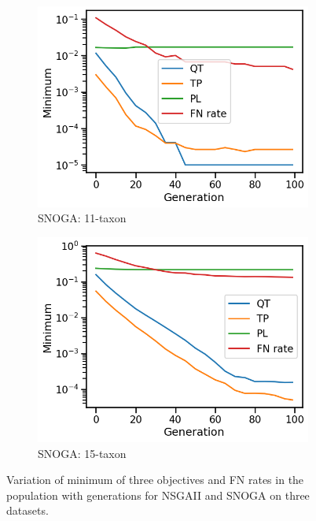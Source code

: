 \begin{figure}[!htbp]
\begin{adjustwidth}{-1cm}{-1cm}
\begin{subfigure}[b]{0.4\textwidth}
			\includegraphics[width=\textwidth]{Figure/11-taxon_NOSSGA_minimum}
			\caption{SNOGA: 11-taxon}
		\end{subfigure}%
		\begin{subfigure}[b]{0.4\textwidth}
			\includegraphics[width=\textwidth]{Figure/15-taxon_NOSSGA_minimum}
			\caption{SNOGA: 15-taxon}
		\end{subfigure}
		\caption{Variation of minimum of three objectives and FN rates in the population with generations for NSGAII and SNOGA on three datasets.
		}
		\label{fig:gen_wise_min}
	\end{adjustwidth}
\end{figure}

